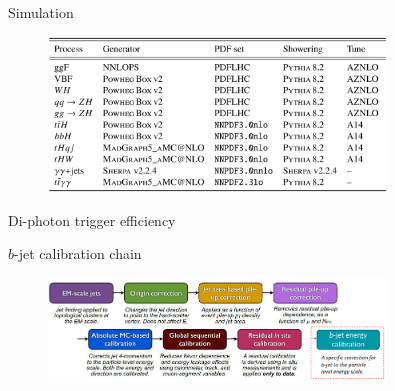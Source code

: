 \begin{frame}{Simulation}
    \begin{figure}
        \centering
        \includegraphics[width=0.8\textwidth]{BackUp/Part3/Img/Single_Higgs_samples.png}
    \end{figure}
\end{frame}
\begin{frame}{Di-photon trigger efficiency}
\begin{figure}
    \centering
\end{figure}
\end{frame}

\begin{frame}{$b$-jet calibration chain}
    \begin{figure}
        \centering
        \includegraphics[width=0.8\textwidth]{BackUp/Part3/Img/b_jet_chain.png}
    \end{figure}
\end{frame}

